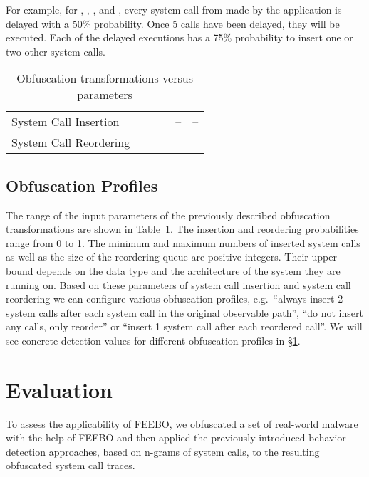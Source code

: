 \documentclass{llncs}
\begin{document}
For example, for , , ,  and , every system call from  made by the application is delayed with a 50\% probability. Once 5 calls have been delayed, they will be executed. Each of the delayed executions has a 75\% probability to insert one or two other system calls.

\begin{table}[t]
 \centering
 \begin{tabular}{|l | c | c | c | c | c |}
  \hline
  &  &  &  &  &  \\
  \hline \hline
  System Call Insertion &  &  &  & -- & -- \\
  \hline
  System Call Reordering &  &  &  &  &  \\
  \hline
 \end{tabular}
 \vspace{0.5em}
 \caption{Obfuscation transformations versus parameters}
 \label{tab:params}\vspace{-1.75em}
\end{table}


\subsection{Obfuscation Profiles} \label{subsec:profiles}
The range of the input parameters of the previously described obfuscation transformations are shown in Table~\ref{tab:params}. The insertion and reordering probabilities range from 0 to 1. The minimum and maximum numbers of inserted system calls as well as the size of the reordering queue are positive integers. Their upper bound depends on the data type and the architecture of the system they are running on.
Based on these parameters of system call insertion and system call reordering we can configure various obfuscation profiles, e.g.~``always insert 2 system calls after each system call in the original observable path'', ``do not insert any calls, only reorder'' or ``insert 1 system call after each reordered call''. We will see concrete detection values for different obfuscation profiles in \S\ref{sec:evaluation}. 
\section{Evaluation}
\label{sec:evaluation}

To assess the applicability of FEEBO, we obfuscated a set of real-world malware with the help of FEEBO and then applied the previously introduced behavior detection approaches, based on n-grams of system calls, to the resulting obfuscated system call traces.
\end{document}
